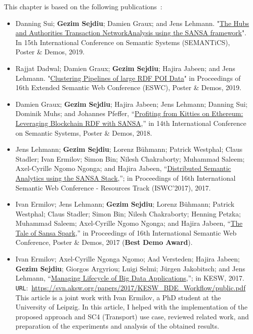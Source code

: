 This chapter is based on the following publications~\cite{lehmann-2017-sansa-iswc}:
\begin{itemize}

   \item Danning Sui; \textbf{Gezim Sejdiu}; Damien Graux; and Jens Lehmann. "\href{https://gezimsejdiu.github.io/publications/sansa-hubs-and-authorities-transaction-semantics19-poster.pdf}{The Hubs and Authorities Transaction NetworkAnalysis using the SANSA framework}".  In 15th International Conference on Semantic Systems (SEMANTiCS), Poster \& Demos, 2019.
   
    \item Rajjat Dadwal; Damien Graux; \textbf{Gezim Sejdiu}; Hajira Jabeen; and Jens Lehmann. "\href{https://gezimsejdiu.github.io/publications/piping-clustering-eswc19-poster.pdf}{Clustering Pipelines of large RDF POI Data}" in Proceedings of 16th Extended Semantic Web Conference (ESWC), Poster \& Demos, 2019.
   
   \item Damien Graux; \textbf{Gezim Sejdiu}; Hajira Jabeen; Jens Lehmann; Danning Sui; Dominik Muhs; and Johannes Pfeffer, “\href{http://jens-lehmann.org/files/2018/semantics_ethereum_pd.pdf}{Profiting from Kitties on Ethereum: Leveraging Blockchain RDF with SANSA},” in 14th International Conference on Semantic Systems, Poster \& Demos, 2018.
  
    \item Jens Lehmann; \textbf{Gezim Sejdiu}; Lorenz Bühmann; Patrick Westphal; Claus Stadler; Ivan Ermilov; Simon Bin; Nilesh Chakraborty; Muhammad Saleem; Axel-Cyrille Ngomo Ngonga; and Hajira Jabeen, “\href{http://svn.aksw.org/papers/2017/ISWC_SANSA_SoftwareFramework/public.pdf}{Distributed Semantic Analytics using the SANSA Stack},”; in Proceedings of 16th International Semantic Web Conference - Resources Track (ISWC’2017), 2017.

    \item Ivan Ermilov; Jens Lehmann; \textbf{Gezim Sejdiu}; Lorenz Bühmann; Patrick Westphal; Claus Stadler; Simon Bin; Nilesh Chakraborty; Henning Petzka; Muhammad Saleem; Axel-Cyrille Ngomo Ngonga; and Hajira Jabeen, “\href{http://jens-lehmann.org/files/2017/iswc_pd_sansa.pdf}{The Tale of Sansa Spark},” in Proceedings of 16th International Semantic Web Conference, Poster \& Demos, 2017 ({\color{darkred}\textbf{Best Demo Award}}).

    \item Ivan Ermilov; Axel-Cyrille Ngonga Ngomo; Aad Versteden; Hajira Jabeen; \textbf{Gezim Sejdiu}; Giorgos Argyriou; Luigi Selmi; Jürgen Jakobitsch; and Jens Lehmann, “\href{https://svn.aksw.org/papers/2017/KESW_BDE_Workflow/public.pdf}{Managing Lifecycle of Big Data Applications},”; in KESW, 2017. \texttt{URL}:~\url{https://svn.aksw.org/papers/2017/KESW_BDE_Workflow/public.pdf}
    This article is a joint work with Ivan Ermilov, a PhD student at the University of Leipzig. 
    In this article, I helped with the implementation of the proposed approach and SC4 (Transport) use case, reviewed related work, and preparation of the experiments and analysis of the obtained results.


\end{itemize}
